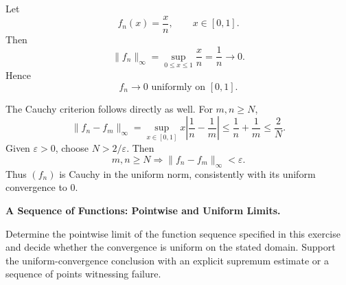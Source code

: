 \begin{solution}
Let
\[
f_n(x)=\frac{x}{n},\qquad x\in[0,1].
\]
Then
\[
\|f_n\|_\infty
=
\sup_{0\le x\le1}\frac{x}{n}
=
\frac1n
\longrightarrow0.
\]
Hence
\[
\boxed{f_n\to0\text{ uniformly on }[0,1].}
\]

The Cauchy criterion follows directly as well. For \(m,n\ge N\),
\[
\|f_n-f_m\|_\infty
=
\sup_{x\in[0,1]}
x\left|\frac1n-\frac1m\right|
\le
\frac1n+\frac1m
\le
\frac{2}{N}.
\]
Given \(\varepsilon>0\), choose \(N>2/\varepsilon\). Then
\[
m,n\ge N
\Longrightarrow
\|f_n-f_m\|_\infty<\varepsilon.
\]
Thus \((f_n)\) is Cauchy in the uniform norm, consistently with its uniform
convergence to \(0\).
\end{solution}


\begin{problem}[CP-II-0470]
\label{prob:cp-ii-0470}
\textbf{A Sequence of Functions: Pointwise and Uniform Limits.}

\hspace*{1.5em}Determine the pointwise limit of the function sequence specified in this
exercise and decide whether the convergence is uniform on the stated domain.
Support the uniform-convergence conclusion with an explicit supremum estimate
or a sequence of points witnessing failure.
\end{problem}

